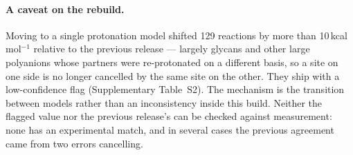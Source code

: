 \paragraph{A caveat on the rebuild.} Moving to a single protonation model
shifted 129 reactions by more than 10\,kcal\,mol$^{-1}$ relative to the previous
release --- largely glycans and other large polyanions whose partners were
re-protonated on a different basis, so a site on one side is no longer cancelled
by the same site on the other. They ship with a low-confidence flag
(Supplementary Table~S2). The mechanism is the transition between models rather
than an inconsistency inside this build. Neither the flagged value nor the
previous release's can be checked against measurement: none has an experimental
match, and in several cases the previous agreement came from two errors
cancelling.
